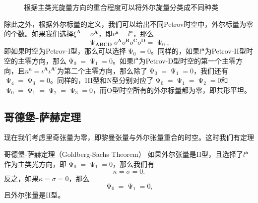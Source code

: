 \begin{figure}[h]
	\centering
	
	\caption{根据主类光旋量方向的重合程度可以将外尔旋量分类成不同种类}
	\label{fig:Petrov}
\end{figure}

除此之外，根据外尔标量的定义，我们可以给出不同Petrov时空中，外尔标量为零的个数。如果我们选择$\xi ^{\boldsymbol{A}} =o^{\boldsymbol{A}}$，即$v^{\boldsymbol{a}} =l^{\boldsymbol{a}}$，那么
\begin{equation*}
	\upPsi _{\boldsymbol{ABCD}} o^{\boldsymbol{A}} o^{\boldsymbol{B}} o^{\boldsymbol{C}} o^{\boldsymbol{D}} =\upPsi _{0} ,
\end{equation*}
即如果时空为Petrov-I型，那么可以选择$\upPsi _{0} =0$。同样的，如果$l^{\boldsymbol{a}}$为Petrov-II型时空的主零方向，那么$\upPsi _{0} =\upPsi _{1} =0$。如果$l^{\boldsymbol{a}}$为Petrov-D型时空的第一个主零方向，且$n^{\boldsymbol{a}} =\iota ^{\boldsymbol{A}} \iota ^{\boldsymbol{A} '}$为第二个主零方向，那么除了$\upPsi _{0} =\upPsi _{1} =0$，我们还有$\upPsi _{4} =\upPsi _{3} =0$。同样的，III型和N型分别对应了$\upPsi _{0} =\upPsi _{1} =\upPsi _{2} =0$和$\upPsi _{0} =\upPsi _{1} =\upPsi _{2} =\upPsi _{3} =0$，而O型时空所有的外尔标量都为零，即共形平坦。


\subsection{哥德堡-萨赫定理}

现在我们考虑里奇张量为零，即黎曼张量与外尔张量重合的时空。这时我们有定理

\begin{them}[label={Goldberg-Sachs Theorem}]{哥德堡-萨赫定理（Goldberg-Sachs Theorem）}
	如果外尔张量是II型，且选择了$l^{\boldsymbol{a}}$作为主类光方向，即$\upPsi _{0} =\upPsi _{1} =0$，那么我们有
	\begin{equation*}
		\kappa =\sigma =0.
	\end{equation*}
	反之，如果$\kappa =\sigma =0$，那么
	\begin{equation*}
		\upPsi _{0} =\upPsi _{1} =0,
	\end{equation*}
	且外尔张量是II型。
\end{them}

